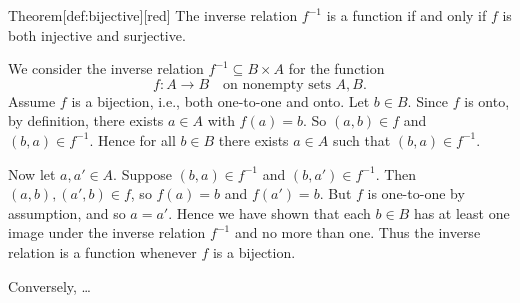 \begin{define}{Theorem}[def:bijective][red]
  The inverse relation $f^{-1}$ is a function if and only if $f$ is both injective and surjective.
    
    

  \begin{subprove}
    We consider the inverse relation $f^{-1} \subseteq B \times A$ for the function 
    \[
    f : A \to B \quad \text{on nonempty sets $A,B$.}
    \]
    Assume $f$ is a bijection, i.e., both one-to-one and onto. Let $b \in B$. Since $f$ is onto, by definition, there exists $a \in A$ with $f(a) = b$. So $(a,b) \in f$ and $(b,a) \in f^{-1}$. Hence for all $b \in B$ there exists $a \in A$ such that $(b,a) \in f^{-1}$. 

    Now let $a, a' \in A$. Suppose $(b,a) \in f^{-1}$ and $(b,a') \in f^{-1}$. Then $(a,b), (a',b) \in f$, so $f(a) = b$ and $f(a') = b$. But $f$ is one-to-one by assumption, and so $a = a'$. Hence we have shown that each $b \in B$ has at least one image under the inverse relation $f^{-1}$ and no more than one. Thus the inverse relation is a function whenever $f$ is a bijection.

    \medskip
    Conversely, \dots
  \end{subprove}
\end{define}






